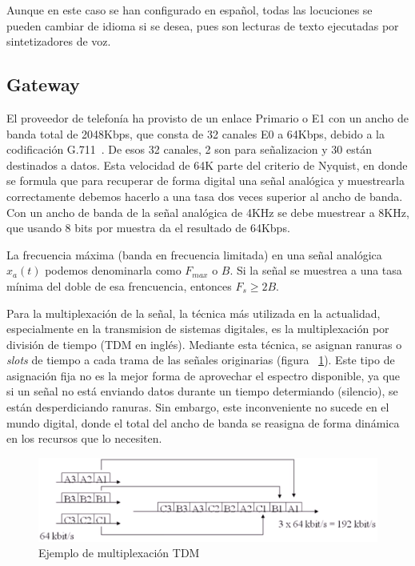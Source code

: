 \documentclass[a4paper, 12pt]{book}
\begin{document}
Aunque en este caso se han configurado en español, todas las locuciones se pueden cambiar de idioma si se desea, pues son lecturas de texto ejecutadas por sintetizadores de voz.

\subsection{Gateway}
\label{sec:gateway}

El proveedor de telefonía ha provisto de un enlace Primario o E1 con un ancho de banda total de 2048Kbps, que consta de 32 canales E0 a 64Kbps, debido a la codificación G.711~\cite{itu}. De esos 32 canales, 2 son para señalizacion y 30 están destinados a datos. 
Esta velocidad de 64K parte del criterio de Nyquist, en donde se formula que para recuperar de forma digital una señal analógica y muestrearla correctamente debemos hacerlo a una tasa dos veces superior al ancho de banda. 
Con un ancho de banda de la señal analógica de 4KHz se debe muestrear a 8KHz, que usando 8 bits por muestra da el resultado de 64Kbps.

La frecuencia máxima (banda en frecuencia limitada) en una señal analógica $x_{a}(t)$ podemos denominarla como $F_{max}$  o $B$. Si la señal se muestrea a una tasa mínima del doble de esa frencuencia, entonces $F_{s} \geq 2B$.

Para la multiplexación de la señal, la técnica más utilizada en la actualidad, especialmente en la transmision de sistemas digitales, es la multiplexación por división de tiempo (TDM en inglés). Mediante esta técnica, se asignan ranuras o \emph{slots} de tiempo a cada trama de las señales originarias (figura ~\ref{figura:fig_tdm}). Este tipo de asignación fija no es la mejor forma de aprovechar el espectro disponible, ya que si un señal no está enviando datos durante un tiempo determiando (silencio), se están desperdiciando ranuras. Sin embargo, este inconveniente no sucede en el mundo digital, donde el total del ancho de banda se reasigna de forma dinámica en los recursos que lo necesiten.

\begin{figure}
  \centering
  \includegraphics[scale=0.7]{img/fig_tdm}
  \caption{Ejemplo de multiplexación TDM}
  \label{figura:fig_tdm}
\end{figure}
\end{document}

